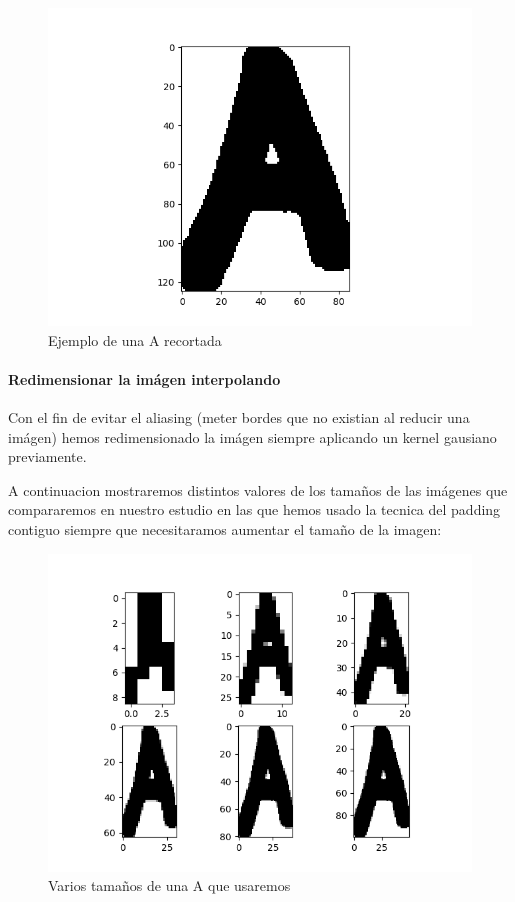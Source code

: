 \documentclass[8pt,a4paper]{{esannV2}}
\begin{document}
\begin{figure}[htbp]
    \centering
    \includegraphics[scale=0.3]{./Arecortada.png}
    \caption{Ejemplo de una A recortada}
\end{figure}

\paragraph{Redimensionar la imágen interpolando}

Con el fin de evitar el aliasing (meter bordes que no existian al reducir una imágen) hemos redimensionado la imágen siempre aplicando un kernel gausiano previamente.

A continuacion mostraremos distintos valores de los tamaños de las imágenes que compararemos en nuestro estudio en las que hemos usado la tecnica del padding contiguo siempre que necesitaramos aumentar el tamaño de la imagen:

\begin{figure}[htbp]
   \centering
    \includegraphics[scale=0.3]{./A_Variando_Tam.png}
    \caption{Varios tamaños de una A que usaremos}
\end{figure}
\newpage
\end{document}
